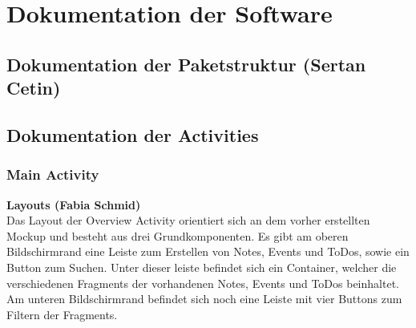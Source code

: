 \section{Dokumentation der Software}
\label{instal}

\subsection{Dokumentation der Paketstruktur (Sertan Cetin)}
 
\subsection{Dokumentation der Activities}

\subsubsection{Main Activity}

\textbf{Layouts (Fabia Schmid)}\\
Das Layout der Overview Activity orientiert sich an dem vorher erstellten Mockup und besteht aus drei Grundkomponenten. Es gibt am oberen Bildschirmrand eine Leiste zum Erstellen von Notes, Events und ToDos, sowie ein Button zum Suchen. Unter dieser leiste befindet sich ein Container, welcher die verschiedenen Fragments der vorhandenen Notes, Events und ToDos beinhaltet. Am unteren Bildschirmrand befindet sich noch eine Leiste mit vier Buttons zum Filtern der  Fragments.

